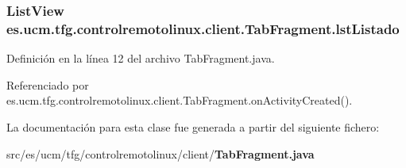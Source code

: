 \subsubsection[{lst\-Listado}]{\setlength{\rightskip}{0pt plus 5cm}List\-View es.\-ucm.\-tfg.\-controlremotolinux.\-client.\-Tab\-Fragment.\-lst\-Listado\hspace{0.3cm}{\ttfamily [private]}}\label{classes_1_1ucm_1_1tfg_1_1controlremotolinux_1_1client_1_1TabFragment_a87d16cd00e5a8b797d1682dc5113f3f3}


Definición en la línea 12 del archivo Tab\-Fragment.\-java.



Referenciado por es.\-ucm.\-tfg.\-controlremotolinux.\-client.\-Tab\-Fragment.\-on\-Activity\-Created().



La documentación para esta clase fue generada a partir del siguiente fichero\-:\begin{DoxyCompactItemize}
\item 
src/es/ucm/tfg/controlremotolinux/client/{\bf Tab\-Fragment.\-java}\end{DoxyCompactItemize}
